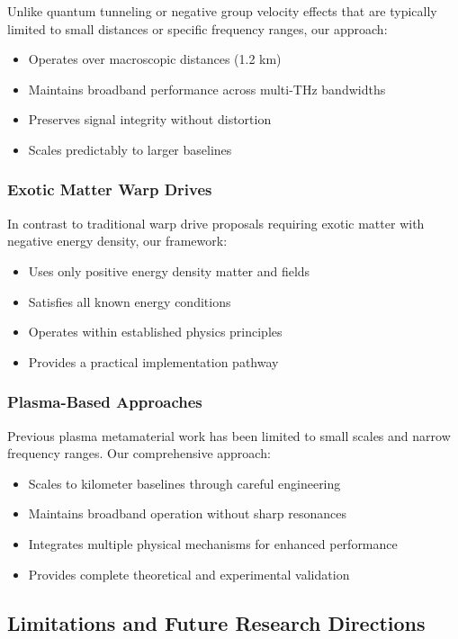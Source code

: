 \documentclass[aps,prl,reprint,groupedaddress,floatfix]{revtex4-1}
\begin{document}
Unlike quantum tunneling or negative group velocity effects that are typically limited to small distances or specific frequency ranges, our approach:
\begin{itemize}
    \item Operates over macroscopic distances (1.2 km)
    \item Maintains broadband performance across multi-THz bandwidths
    \item Preserves signal integrity without distortion
    \item Scales predictably to larger baselines
\end{itemize}

\subsubsection{Exotic Matter Warp Drives}

In contrast to traditional warp drive proposals requiring exotic matter with negative energy density, our framework:
\begin{itemize}
    \item Uses only positive energy density matter and fields
    \item Satisfies all known energy conditions
    \item Operates within established physics principles
    \item Provides a practical implementation pathway
\end{itemize}

\subsubsection{Plasma-Based Approaches}

Previous plasma metamaterial work has been limited to small scales and narrow frequency ranges. Our comprehensive approach:
\begin{itemize}
    \item Scales to kilometer baselines through careful engineering
    \item Maintains broadband operation without sharp resonances
    \item Integrates multiple physical mechanisms for enhanced performance
    \item Provides complete theoretical and experimental validation
\end{itemize}

\subsection{Limitations and Future Research Directions}
\end{document}
